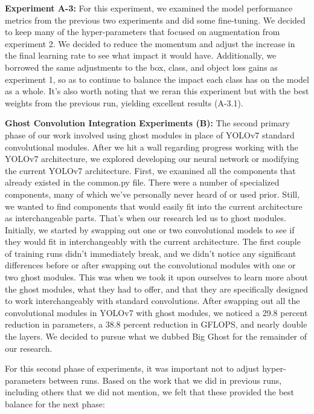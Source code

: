 \documentclass[sigplan,nonacm]{acmart}
\begin{document}
\textbf{Experiment A-3: }
For this experiment, we examined the model performance metrics from the previous two experiments and did some fine-tuning. We decided to keep many of the hyper-parameters that focused on augmentation from experiment 2. We decided to reduce the momentum and adjust the increase in the final learning rate to see what impact it would have.  Additionally, we borrowed the same adjustments to the box, class, and object loss gains as experiment 1, so as to continue to balance the impact each class has on the model as a whole. It's also worth noting that we reran this experiment but with the best weights from the previous run, yielding excellent results (A-3.1). 

\textbf{Ghost Convolution Integration Experiments (B):}
The second primary phase of our work involved using ghost modules in place of YOLOv7 standard convolutional modules. After we hit a wall regarding progress working with the YOLOv7 architecture, we explored developing our neural network or modifying the current YOLOv7 architecture. First, we examined all the components that already existed in the common.py file. There were a number of specialized components, many of which we've personally never heard of or used prior. Still, we wanted to find components that would easily fit into the current architecture as interchangeable parts. That's when our research led us to ghost modules. Initially, we started by swapping out one or two convolutional models to see if they would fit in interchangeably with the current architecture. The first couple of training runs didn't immediately break, and we didn't notice any significant differences before or after swapping out the convolutional modules with one or two ghost modules. This was when we took it upon ourselves to learn more about the ghost modules, what they had to offer, and that they are specifically designed to work interchangeably with standard convolutions. After swapping out all the convolutional modules in YOLOv7 with ghost modules, we noticed a 29.8 percent reduction in parameters, a 38.8 percent reduction in GFLOPS, and nearly double the layers. We decided to pursue what we dubbed Big Ghost for the remainder of our research. 

For this second phase of experiments, it was important not to adjust hyper-parameters between runs. Based on the work that we did in previous runs, including others that we did not mention, we felt that these provided the best balance for the next phase:
\end{document}
